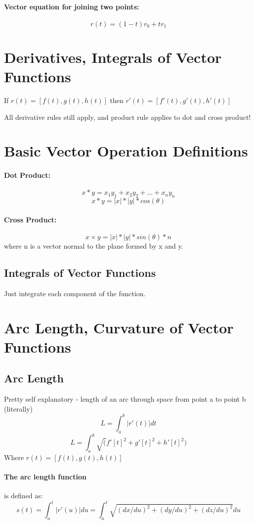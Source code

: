\documentclass[a4paper,12pt]{report}
\begin{document}
\paragraph{Vector equation for joining two points: } $$r(t) = (1-t)r_0 + tr_1$$

\section{Derivatives, Integrals of Vector Functions}
If $r(t) = [f(t), g(t), h(t)]$ then $r'(t) = [f'(t), g'(t), h'(t)]$

All derivative rules still apply, and product rule applies to dot and cross product!

\section{Basic Vector Operation Definitions}
\paragraph{Dot Product: } $$x * y = x_1y_1+x_2y_2+ ... + x_ny_n$$
$$x * y = |x|*|y|*cos(\theta)$$
\paragraph{Cross Product: } $$x \times y = |x|*|y|*sin(\theta) * n$$ where n is a vector normal to the plane formed by x and y.

\subsection{Integrals of Vector Functions}
Just integrate each component of the function.

\section{Arc Length, Curvature of Vector Functions}
\subsection{Arc Length}
Pretty self explanatory - length of an arc through space from point a to point b (literally)
$$L = \int_a^b |r'(t)|dt$$
$$L = \int_a^b \sqrt(f'[t]^2 + g'[t]^2 + h'[t]^2)$$
Where $r(t) = [f(t), g(t), h(t)]$

\paragraph{The arc length function } is defined as: 
$$s(t) = \int_a^t |r'(u)| du = \int_a^t \sqrt{(dx/du)^2 + (dy/du)^2 + (dz/du)^2} du$$
\end{document}
